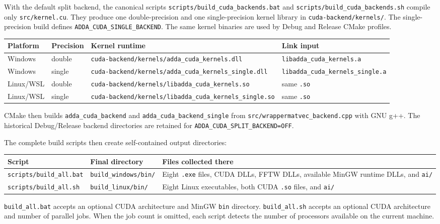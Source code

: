 \documentclass[11pt,a4paper]{article}
\newcommand{\code}[1]{\nolinkurl{#1}}
\begin{document}
With the default split backend, the canonical scripts
\code{scripts/build_cuda_backends.bat} and
\code{scripts/build_cuda_backends.sh} compile only \code{src/kernel.cu}. They
produce one double-precision and one single-precision kernel library in
\code{cuda-backend/kernels/}. The single-precision build defines
\code{ADDA_CUDA_SINGLE_BACKEND}. The same kernel binaries are used by Debug and
Release CMake profiles.

\small
\begin{longtable}{@{}L{0.14\textwidth}L{0.16\textwidth}L{0.31\textwidth}L{0.29\textwidth}@{}}
\toprule
\textbf{Platform} & \textbf{Precision} & \textbf{Kernel runtime} & \textbf{Link input} \\
\midrule
\endhead
Windows & double & \code{cuda-backend/kernels/adda_cuda_kernels.dll} & \code{libadda_cuda_kernels.a} \\
Windows & single & \code{cuda-backend/kernels/adda_cuda_kernels_single.dll} & \code{libadda_cuda_kernels_single.a} \\
Linux/WSL & double & \code{cuda-backend/kernels/libadda_cuda_kernels.so} & same \code{.so} \\
Linux/WSL & single & \code{cuda-backend/kernels/libadda_cuda_kernels_single.so} & same \code{.so} \\
\bottomrule
\end{longtable}
\normalsize

CMake then builds \code{adda_cuda_backend} and
\code{adda_cuda_backend_single} from \code{src/wrappermatvec_backend.cpp} with
GNU g++. The historical Debug/Release backend directories are retained for
\code{ADDA_CUDA_SPLIT_BACKEND=OFF}.

The complete build scripts then create self-contained output directories:

\begin{longtable}{@{}L{0.25\textwidth}L{0.20\textwidth}L{0.47\textwidth}@{}}
\toprule
\textbf{Script} & \textbf{Final directory} & \textbf{Files collected there} \\
\midrule
\endhead
\code{scripts/build_all.bat} & \code{build_windows/bin/} & Eight \code{.exe} files, CUDA DLLs, FFTW DLLs, available MinGW runtime DLLs, and \code{ai/} \\
\code{scripts/build_all.sh} & \code{build_linux/bin/} & Eight Linux executables, both CUDA \code{.so} files, and \code{ai/} \\
\bottomrule
\end{longtable}

\code{build_all.bat} accepts an optional CUDA architecture and MinGW
\code{bin} directory. \code{build_all.sh} accepts an optional CUDA architecture
and number of parallel jobs. When the job count is omitted, each script detects
the number of processors available on the current machine.
\end{document}
